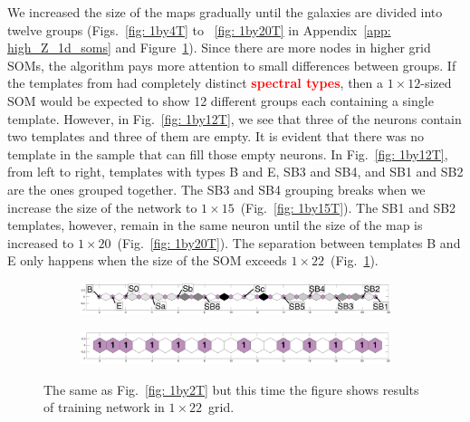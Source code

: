             We increased the size of the maps gradually until the galaxies are divided into twelve groups (Figs.~\ref{fig: 1by4T} to ~\ref{fig: 1by20T} in Appendix~\ref{app: high_Z_1d_soms} and Figure~\ref{fig: 1by22T}).
            Since there are more nodes in higher grid SOMs, the algorithm 
            pays more attention to small differences between groups.
            If the templates from  had completely distinct \textbf{\textcolor{red}{spectral types}}, then a $1\times12$-sized SOM would be expected to show 12 different groups each containing a single template.
            However, in Fig.~\ref{fig: 1by12T}, we see that three of the neurons contain two templates and three of them are empty.
            It is evident that there was no template in the  sample that can fill those empty neurons.
            In Fig.~\ref{fig: 1by12T}, from left to right, templates with types B and E, SB3 and SB4, and SB1 and SB2 are the ones grouped together. 
            The SB3 and SB4 grouping breaks when we increase the size of the network to $1\times15$~(Fig.~\ref{fig: 1by15T}).
            The SB1 and SB2 templates, however, remain in the same neuron until the size of the map is increased to $1\times20$~(Fig.~\ref{fig: 1by20T}).
            The separation between templates B and E only happens when the size of the SOM exceeds $1\times22$~(Fig.~\ref{fig: 1by22T}).
        \begin{figure}
            \begin{subfigure}[b]{\textwidth}
                \centering
                \includegraphics[width=\textwidth]{images0.01/1d/dist_1_by_22.png}
            \end{subfigure}
            \hfill
            \begin{subfigure}[b]{\textwidth}
                \includegraphics[width=\textwidth]{images0.01/1d/hit_t_1_by_22.png}
            \end{subfigure}
            \caption[Results of training network in $1\times22$~grid]{The same as Fig.~\ref{fig: 1by2T} but this time the figure shows results of training network in $1\times22$~grid.}
            \label{fig: 1by22T}
        \end{figure} 
    
